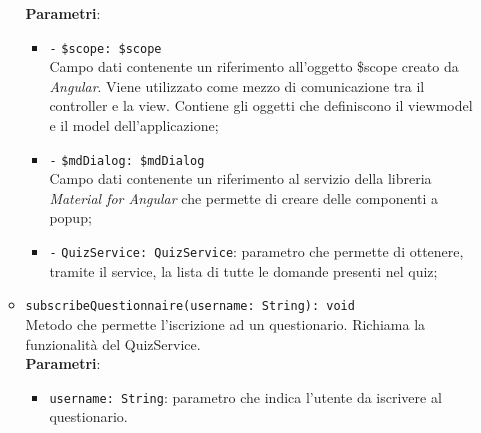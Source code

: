 \begin{itemize}
\begin{itemize}
			\textbf{Parametri}:
			\begin{itemize}
					\item \texttt{-} \texttt{\$scope: \$scope} \\
					Campo dati contenente un riferimento all’oggetto \$scope creato da \textit{Angular}. Viene utilizzato come mezzo di comunicazione tra il controller e la view. Contiene gli oggetti che definiscono il viewmodel e il model dell’applicazione;
					\item \texttt{-} \texttt{\$mdDialog: \$mdDialog} \\
					Campo dati contenente un riferimento al servizio della libreria \textit{Material for Angular} che permette di creare delle componenti a popup;
					\item \texttt{-} \texttt{QuizService: QuizService}: parametro che permette di ottenere, tramite il service, la lista di tutte le domande presenti nel quiz; 
			\end{itemize}
		\item \texttt{subscribeQuestionnaire(username: String): void} \\ Metodo che permette l'iscrizione ad un questionario. Richiama la funzionalità del QuizService. \\
		\textbf{Parametri}:
		\begin{itemize}
			\item \texttt{username: String}: parametro che indica l'utente da iscrivere al questionario.
		\end{itemize}
	\end{itemize}
\end{itemize}

